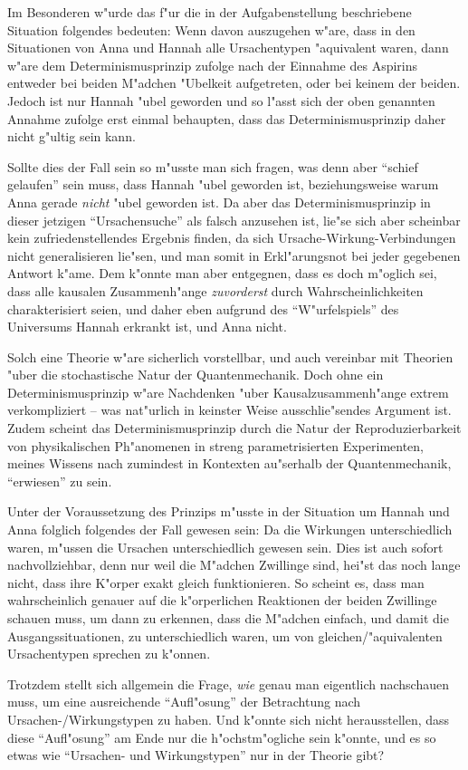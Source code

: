 \documentclass[a4paper]{article}
\begin{document}
Im Besonderen w"urde das f"ur die in der Aufgabenstellung beschriebene Situation folgendes bedeuten: Wenn davon auszugehen w"are, dass in den Situationen von Anna und Hannah alle Ursachentypen "aquivalent waren, dann w"are dem Determinismusprinzip zufolge nach der Einnahme des Aspirins entweder bei beiden M"adchen "Ubelkeit aufgetreten, oder bei keinem der beiden. Jedoch ist nur Hannah "ubel geworden und so l"asst sich der oben genannten Annahme zufolge erst einmal behaupten, dass das Determinismusprinzip daher nicht g"ultig sein kann.

Sollte dies der Fall sein so m"usste man sich fragen, was denn aber "`schief gelaufen"' sein muss, dass Hannah "ubel geworden ist, beziehungsweise warum Anna gerade \emph{nicht} "ubel geworden ist. Da aber das Determinismusprinzip in dieser jetzigen "`Ursachensuche"' als falsch anzusehen ist, lie"se sich aber scheinbar kein zufriedenstellendes Ergebnis finden, da sich Ursache-Wirkung-Verbindungen nicht generalisieren lie"sen, und man somit in Erkl"arungsnot bei jeder gegebenen Antwort k"ame. Dem k"onnte man aber entgegnen, dass es doch m"oglich sei, dass alle kausalen Zusammenh"ange \emph{zuvorderst} durch Wahrscheinlichkeiten charakterisiert seien, und daher eben aufgrund des "`W"urfelspiels"' des Universums Hannah erkrankt ist, und Anna nicht.

Solch eine Theorie w"are sicherlich vorstellbar, und auch vereinbar mit Theorien "uber die stochastische Natur der Quantenmechanik. Doch ohne ein Determinismusprinzip w"are Nachdenken "uber Kausalzusammenh"ange extrem verkompliziert -- was nat"urlich in keinster Weise ausschlie"sendes Argument ist. Zudem scheint das Determinismusprinzip durch die Natur der Reproduzierbarkeit von physikalischen Ph"anomenen in streng parametrisierten Experimenten, meines Wissens nach zumindest in Kontexten au"serhalb der Quantenmechanik, "`erwiesen"' zu sein. 

Unter der Voraussetzung des Prinzips m"usste in der Situation um Hannah und Anna folglich folgendes der Fall gewesen sein: Da die Wirkungen unterschiedlich waren, m"ussen die Ursachen unterschiedlich gewesen sein. Dies ist auch sofort nachvollziehbar, denn nur weil die M"adchen Zwillinge sind, hei"st das noch lange nicht, dass ihre K"orper exakt gleich funktionieren. So scheint es, dass man wahrscheinlich genauer auf die k"orperlichen Reaktionen der beiden Zwillinge schauen muss, um dann zu erkennen, dass die M"adchen einfach, und damit die Ausgangssituationen, zu unterschiedlich waren, um von gleichen/"aquivalenten Ursachentypen sprechen zu k"onnen.

Trotzdem stellt sich allgemein die Frage, \emph{wie} genau man eigentlich nachschauen muss, um eine ausreichende "`Aufl"osung"' der Betrachtung nach Ursachen-/Wirkungstypen zu haben. Und k"onnte sich nicht herausstellen, dass diese "`Aufl"osung"' am Ende nur die h"ochstm"ogliche sein k"onnte, und es so etwas wie "`Ursachen- und Wirkungstypen"' nur in der Theorie gibt?
\end{document}
